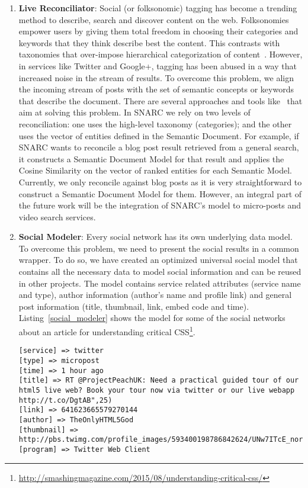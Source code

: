 \begin{enumerate}

  \item \textbf{Live Reconciliator}: Social (or folksonomic) tagging has become a trending method to describe, search and discover content on the web. Folksonomies empower users by giving them total freedom in choosing their categories and keywords that they think describe best the content. This contrasts with taxonomies that over-impose hierarchical categorization of content~\cite{Zanardi:RecSys:08}. However, in services like Twitter and Google+, tagging has been abused in a way that increased noise in the stream of results. To overcome this problem, we align the incoming stream of posts with the set of semantic concepts or keywords that describe the document. There are several approaches and tools like~\cite{Cantador:EC-WEB:11,Ernesto:RecSys:12,Preotiuc-Pietro:ICWSM:12,Zanardi:RecSys:08} that aim at solving this problem. In SNARC we rely on two levels of reconciliation: one uses the high-level taxonomy (categories); and the other uses the vector of entities defined in the Semantic Document. For example, if SNARC wants to reconcile a blog post result retrieved from a general search, it constructs a Semantic Document Model for that result and applies the Cosine Similarity on the vector of ranked entities for each Semantic Model. Currently, we only reconcile against blog posts as it is very straightforward to construct a Semantic Document Model for them. However, an integral part of the future work will be the integration of SNARC's model to micro-posts and video search services.

  \item \textbf{Social Modeler}: Every social network has its own underlying data model. To overcome this problem, we need to present the social results in a common wrapper. To do so, we have created an optimized universal social model that contains all the necessary data to model social information and can be reused in other projects. The model contains service related attributes (service name and type), author information (author's name and profile link) and general post information (title, thumbnail, link, embed code and time). Listing~\ref{social_modeler} shows the model for some of the social networks about an article for understanding critical CSS\footnote{\url{http://smashingmagazine.com/2015/08/understanding-critical-css/}}.

\begin{lstlisting}
[service] => twitter
[type] => micropost
[time] => 1 hour ago
[title] => RT @ProjectPeachUK: Need a practical guided tour of our html5 live web? Book your tour now via twitter or our live webapp http://t.co/DgtAB",25)
[link] => 641623665579270144
[author] => TheOnlyHTML5God
[thumbnail] => http://pbs.twimg.com/profile_images/593400198786842624/UNw7ITcE_normal.jpg
[program] => Twitter Web Client
\end{lstlisting}


\end{enumerate}
